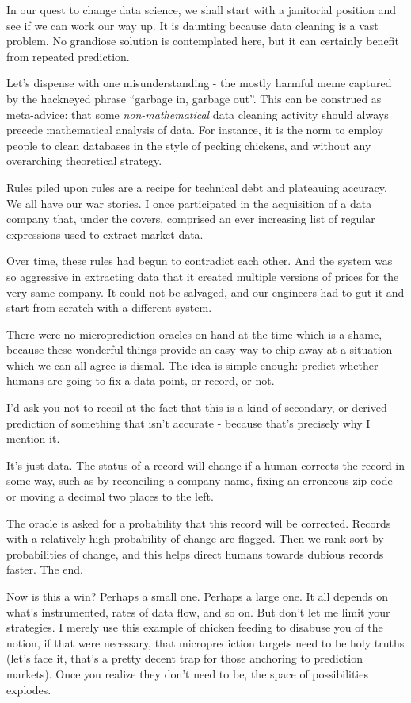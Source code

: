 In our quest to change data science, we shall start with a janitorial position and see if we can work our way up. It is daunting because data cleaning is a vast problem. No grandiose solution is contemplated here, but it can certainly benefit from repeated prediction.  

Let's dispense with one misunderstanding - the mostly harmful meme captured by the hackneyed phrase ``garbage in, garbage out''. This can be construed as meta-advice: that some {\em non-mathematical} data cleaning activity should always precede mathematical analysis of data. For instance, it is the norm to employ people to clean databases in the style of pecking chickens, and without any overarching theoretical strategy. 

Rules piled upon rules are a recipe for technical debt and plateauing accuracy. We all have our war stories. I once participated in the acquisition of a data company that, under the covers, comprised an ever increasing list of regular expressions used to extract market data. 


Over time, these rules had begun to contradict each other. And the system was so aggressive in extracting data that it created multiple versions of prices for the very same company. It could not be salvaged, and our engineers had to gut it and start from scratch with a different system. 

There were no microprediction oracles on hand at the time which is a shame, because these wonderful things provide an easy way to chip away at a situation which we can all agree is dismal. The idea is simple enough: predict whether humans are going to fix a data point, or record, or not.  

I'd ask you not to recoil at the fact that this is a kind of secondary, or derived prediction of something that isn't accurate - because that's precisely why I mention it.  

It's just data. The status of a record will change if a human corrects the record in some way, such as by reconciling a company name, fixing an erroneous zip code or moving a decimal two places to the left. 

The oracle is asked for a probability that this record will be  corrected. Records with a relatively high probability of change are flagged. Then we rank sort by probabilities of change, and this helps direct humans towards dubious records faster. The end. 

Now is this a win? Perhaps a small one. Perhaps a large one. It all depends on what's instrumented, rates of data flow, and so on. But don't let me limit your strategies. I merely use this example of chicken feeding to disabuse you of the notion, if that were necessary, that microprediction targets need to be holy truths (let's face it, that's a pretty decent trap for those anchoring to prediction markets). Once you realize they don't need to be, the space of possibilities explodes. 

